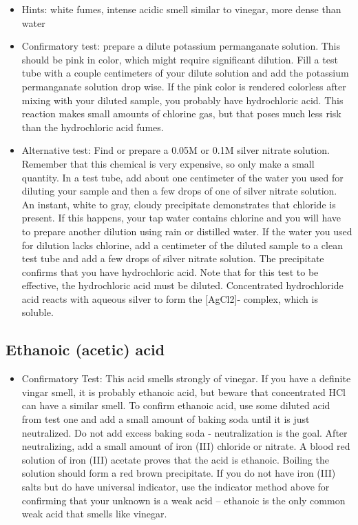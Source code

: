 \begin{itemize}

\item{Hints: white fumes, 
intense acidic smell similar to vinegar, 
more dense than water}

\item{Confirmatory test: 
prepare a dilute potassium permanganate solution. 
This should be pink in color, 
which might require significant dilution. 
Fill a test tube with a couple centimeters of your dilute solution 
and add the potassium permanganate solution drop wise. 
If the pink color is rendered colorless 
after mixing with your diluted sample, 
you probably have hydrochloric acid. 
This reaction makes small amounts of chlorine gas, 
but that poses much less risk than the hydrochloric acid fumes.}

\item{Alternative test: 
Find or prepare a 0.05M or 0.1M silver nitrate solution. 
Remember that this chemical is very expensive, 
so only make a small quantity. 
In a test tube, 
add about one centimeter of the water you used 
for diluting your sample 
and then a few drops of one of silver nitrate solution. 
An instant, 
white to gray, 
cloudy precipitate demonstrates that chloride is present. 
If this happens, 
your tap water contains chlorine 
and you will have to prepare another dilution 
using rain or distilled water. 
If the water you used for dilution lacks chlorine, 
add a centimeter of the diluted sample 
to a clean test tube and add a few drops of silver nitrate solution. 
The precipitate confirms that you have hydrochloric acid. 
Note that for this test to be effective, 
the hydrochloric acid must be diluted. 
Concentrated hydrochloride acid reacts with aqueous silver 
to form the [AgCl2]- complex, 
which is soluble.}

\end{itemize}

\subsection{Ethanoic (acetic) acid}

\begin{itemize}

\item{Confirmatory Test: This acid smells strongly of vinegar. 
If you have a definite vingar smell, 
it is probably ethanoic acid, 
but beware that concentrated HCl can have a similar smell. 
To confirm ethanoic acid, 
use some diluted acid from test one 
and add a small amount of baking soda until it is just neutralized. 
Do not add excess baking soda - neutralization is the goal. 
After neutralizing, 
add a small amount of iron (III) chloride or nitrate. 
A blood red solution of iron (III) acetate 
proves that the acid is ethanoic. 
Boiling the solution should form a red brown precipitate. 
If you do not have iron (III) salts but do have universal indicator, 
use the indicator method above 
for confirming that your unknown is a weak acid – 
ethanoic is the only common weak acid that smells like vinegar.} 
\end{itemize}

